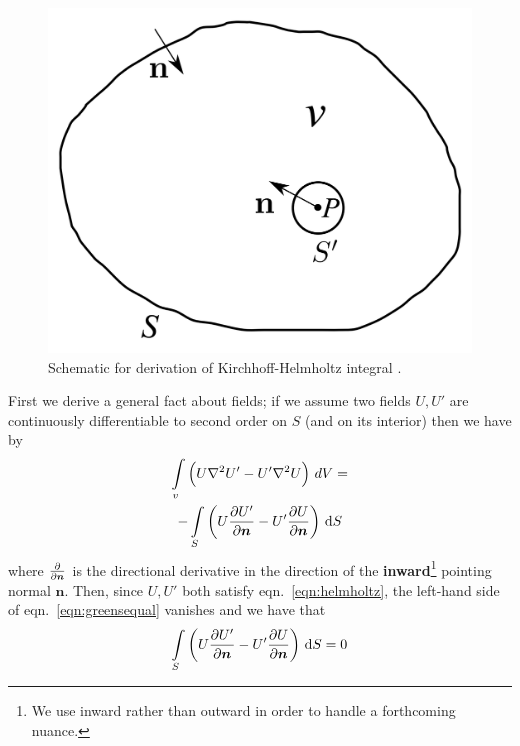 \begin{figure}
    \centering 
    \includegraphics[width=\linewidth]{figures/appendix/kirchoff.png}
    \caption{Schematic for derivation of Kirchhoff-Helmholtz integral \cite{Ivanov2016ElementsOD}.}\label{fig:kirchoff}
\end{figure}

First we derive a general fact about fields; if we assume two fields \(U, U'\) are continuously differentiable to second order on \(S\) (and on its interior) then we have by 
%
\begin{multline}
    \int\limits_{v}\left(U \nabla^2 U' - U' \nabla^2 U \right)\,dV = \\ - \int\limits_{S}\left(U \pdv{U'}{\bm{n}}- U'  \pdv{U}{\bm{n}}\right)\,\dif S\label{eqn:greensequal}
\end{multline}
%
where \(\pdv{}{\bm{n}}\) is the directional derivative in the direction of the \textbf{inward}\footnote{We use inward rather than outward in order to handle a forthcoming nuance.} pointing normal \(\bm{n}\).
%
Then, since \(U, U'\) both satisfy eqn.~\eqref{eqn:helmholtz}, the left-hand side of eqn.~\eqref{eqn:greensequal} vanishes and we have that
%
\begin{equation}
    \int\limits_{S}\left(U \pdv{U'}{\bm{n}} - U'  \pdv{U}{\bm{n}}\right)\,\dif S = 0
    \label{eqn:greenssimple}
\end{equation}

